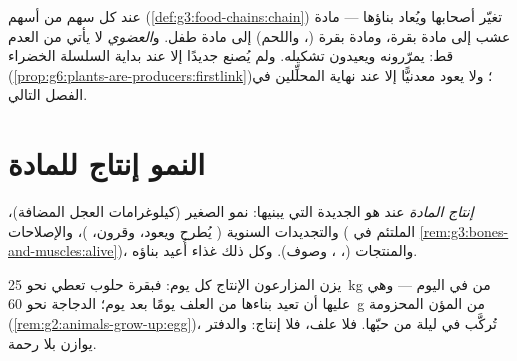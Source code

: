 \begin{remark}\label{rem:g6:matter-from-food:hands}
عند كل سهم من أسهم 
(\cref{def:g3:food-chains:chain}) تغيّر  أصحابها
ويُعاد بناؤها --- مادة عشب إلى مادة بقرة، ومادة بقرة (،
واللحم) إلى مادة طفل. و\emph{العضوي} لا يأتي من العدم قط:
 يمرّرونه ويعيدون تشكيله. ولم يُصنع جديدًا إلا عند بداية
السلسلة الخضراء
(\cref{prop:g6:plants-are-producers:firstlink})؛ ولا يعود معدنيًّا
إلا عند نهاية المحلِّلين في الفصل التالي.
\end{remark}

\section{النمو إنتاج للمادة}

\begin{definition}\label{def:g6:matter-from-food:production}
\emph{إنتاج المادة} عند  هو  الجديدة التي يبنيها: نمو الصغير (كيلوغرامات العجل
المضافة)، والتجديدات السنوية ( يُطرح ويعود، وقرون، )،
والإصلاحات ( الملتئم في
\cref{rem:g3:bones-and-muscles:alive})، والمنتجات (، ،
وصوف). وكل ذلك غذاء أُعيد بناؤه.
\end{definition}

\begin{example}\label{ex:g6:matter-from-food:weighing}
يزن المزارعون الإنتاج كل يوم: فبقرة حلوب تعطي نحو
\qty{25}{kg} من  في اليوم --- وهي  عليها أن تعيد
بناءها من العلف يومًا بعد يوم؛  الدجاجة نحو
\qty{60}{g} من المؤن المحزومة
(\cref{rem:g2:animals-grow-up:egg})، تُركَّب في ليلة من حبّها. فلا
علف، فلا إنتاج: والدفتر يوازن بلا رحمة.
\end{example}

